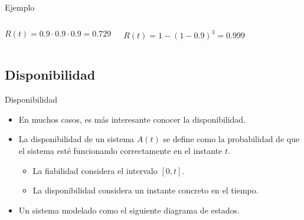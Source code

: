 \begin{frame}[t]{Ejemplo}
\begin{center}

\end{center}

\begin{columns}[T]




\begin{equation*}
R(t) = 0.9 \cdot 0.9 \cdot 0.9 = 0.729
\end{equation*}

\pause
{}



\begin{equation*}
R(t) = 1 - (1 - 0.9)^3 = 0.999
\end{equation*}

\end{columns}

\end{frame}

\subsection{Disponibilidad}

\begin{frame}[t]{Disponibilidad}
\begin{itemize}
  \item En muchos casos, es más interesante conocer la disponibilidad.
  \item La disponibilidad de un sistema $A(t)$ se define como
        la probabilidad de que el sistema esté funcionando correctamente
        en el instante $t$.
    \begin{itemize}
      \item La fiabilidad considera el intervalo $[0,t]$.
      \item La disponibilidad considera un instante concreto en el tiempo.
    \end{itemize}
  \item Un sistema modelado como el siguiente diagrama de estados.
\end{itemize}
\begin{center}

\end{center}
\end{frame}

